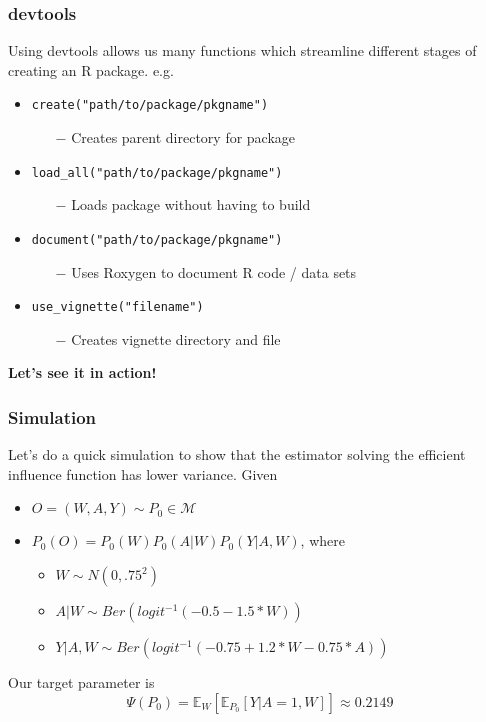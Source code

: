 \documentclass{beamer}
\begin{document}
\begin{frame}
\frametitle{devtools}
Using devtools allows us many functions which streamline different stages of creating an R package. e.g.
\begin{itemize}
  \item \texttt{create("path/to/package/pkgname")}
  \begin{itemize}
  	\item[$-$] Creates parent directory for package
  \end{itemize}
  \item \texttt{load\_all("path/to/package/pkgname")}
  \begin{itemize}
  	\item[$-$] Loads package without having to build
  \end{itemize}
  \item \texttt{document("path/to/package/pkgname")}
  \begin{itemize}
  	\item[$-$] Uses Roxygen to document R code / data sets
  \end{itemize}
  \item \texttt{use\_vignette("filename")}
  \begin{itemize}
  	\item[$-$] Creates vignette directory and file
  \end{itemize}
\end{itemize}
\textbf{Let's see it in action!}
\end{frame}


\begin{frame}
\frametitle{Simulation}
Let's do a quick simulation to show that the estimator solving the efficient influence function has lower variance. 
\vspace{.1in}
Given
\begin{itemize}
  \item $O=(W,A,Y) \sim P_0 \in \mathcal{M}$
  \item $P_0(O) = P_0(W)P_0(A|W)P_0(Y|A,W)$, where
  \begin{itemize}
  	\item $W \sim N(0,.75^2)$
	\item $A|W \sim Ber(logit^{-1}(-0.5 - 1.5*W))$
	\item $Y|A,W \sim Ber(logit^{-1}(-0.75 + 1.2*W - 0.75*A))$
  \end{itemize}
\end{itemize}
Our target parameter is
\begin{equation}
	\Psi(P_0) = \mathbb{E}_{W}[\mathbb{E}_{P_0}[Y|A=1,W]] \approx 0.2149 
\end{equation}
\end{frame}
\end{document}
